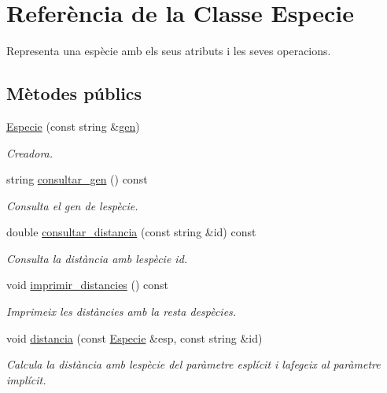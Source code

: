 \hypertarget{class_especie}{}\section{Referència de la Classe Especie}
\label{class_especie}


Representa una espècie amb els seus atributs i les seves operacions.  


\subsection*{Mètodes públics}
\begin{DoxyCompactItemize}
\item 
\hyperlink{class_especie_a597cfbcc08d584338ffe2f5105f9e9c1}{Especie} (const string \&\hyperlink{class_especie_ac35bb565f7346cd6317b3a8c849456d1}{gen})
\begin{DoxyCompactList}\small\item\em Creadora. \end{DoxyCompactList}\item 
string \hyperlink{class_especie_a850af2b59a21e2d801c59d76ba5c1a98}{consultar\+\_\+gen} () const
\begin{DoxyCompactList}\small\item\em Consulta el gen de l\textquotesingle{}espècie. \end{DoxyCompactList}\item 
double \hyperlink{class_especie_ae72023f716c9ae50a160f751b0365efe}{consultar\+\_\+distancia} (const string \&id) const
\begin{DoxyCompactList}\small\item\em Consulta la distància amb l\textquotesingle{}espècie id. \end{DoxyCompactList}\item 
void \hyperlink{class_especie_a305c663aa9f2c8b596e940067fdd6177}{imprimir\+\_\+distancies} () const
\begin{DoxyCompactList}\small\item\em Imprimeix les distàncies amb la resta d\textquotesingle{}espècies. \end{DoxyCompactList}\item 
void \hyperlink{class_especie_abe0e84ff19b61d434d501f943a542bc9}{distancia} (const \hyperlink{class_especie}{Especie} \&esp, const string \&id)
\begin{DoxyCompactList}\small\item\em Calcula la distància amb l\textquotesingle{}espècie del paràmetre esplícit i l\textquotesingle{}afegeix al paràmetre implícit. \end{DoxyCompactList}\item 

\end{DoxyCompactItemize}
